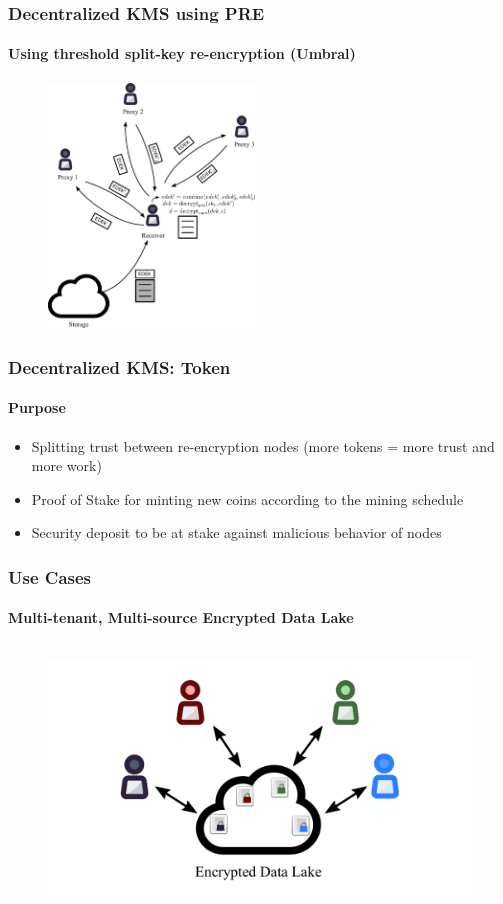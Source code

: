 \documentclass[xetex,mathsans,sans]{beamer}
\begin{document}
    \begin{frame}
        \frametitle{Decentralized KMS using PRE}
        \framesubtitle{Using threshold split-key re-encryption (Umbral)}
        \begin{figure}
            \centering
            \includegraphics[height=6.5cm]{pdf/decrypt-umbral.pdf}
        \end{figure}
    \end{frame}

    \begin{frame}
        \frametitle{Decentralized KMS: Token}
        \framesubtitle{Purpose}
        \begin{itemize}
            \item Splitting trust between re-encryption nodes (more tokens = more trust and more work)
            \item Proof of Stake for minting new coins according to the mining schedule
            \item Security deposit to be at stake against malicious behavior of nodes
        \end{itemize}
    \end{frame}

    \begin{frame}
        \frametitle{Use Cases}
        \framesubtitle{Multi-tenant, Multi-source Encrypted Data Lake}
        \begin{figure}
            \centering
            \includegraphics[height=7cm]{pdf/data-lake.pdf}
        \end{figure}
    \end{frame}
\end{document}
